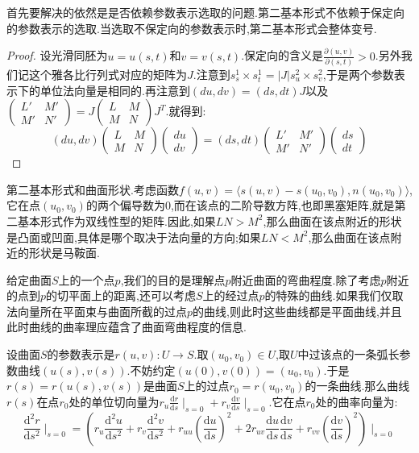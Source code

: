 首先要解决的依然是是否依赖参数表示选取的问题.第二基本形式不依赖于保定向的参数表示的选取.当选取不保定向的参数表示时,第二基本形式会整体变号.
\begin{proof}
	
	设光滑同胚为$u=u(s,t)$和$v=v(s,t)$.保定向的含义是$\frac{\partial(u,v)}{\partial(s,t)}>0$.另外我们记这个雅各比行列式对应的矩阵为$J$.注意到$s^1_s\times s^1_t=|J|s^2_u\times s^2_v$,于是两个参数表示下的单位法向量是相同的.再注意到$(du,dv)=(ds,dt)J$以及$\left(\begin{array}{cc} L'&M'\\ M'&N'\end{array}\right)=J\left(\begin{array}{cc} L&M\\ M&N\end{array}\right)J^T$.就得到:
	$$(du,dv)\left(\begin{array}{cc} L&M\\ M&N\end{array}\right)\left(\begin{array}{c} du\\ dv\end{array}\right)=(ds,dt)\left(\begin{array}{cc} L'&M'\\ M'&N'\end{array}\right)\left(\begin{array}{c} ds\\ dt\end{array}\right)$$
\end{proof}

第二基本形式和曲面形状.考虑函数$f(u,v)=\langle s(u,v)-s(u_0,v_0),n(u_0,v_0)\rangle$,它在点$(u_0,v_0)$的两个偏导数为0,而在该点的二阶导数方阵,也即黑塞矩阵,就是第二基本形式作为双线性型的矩阵.因此,如果$LN>M^2$,那么曲面在该点附近的形状是凸面或凹面,具体是哪个取决于法向量的方向;如果$LN<M^2$,那么曲面在该点附近的形状是马鞍面.

给定曲面$S$上的一个点$p$,我们的目的是理解点$p$附近曲面的弯曲程度.除了考虑$p$附近的点到$p$的切平面上的距离,还可以考虑$S$上的经过点$p$的特殊的曲线.如果我们仅取法向量所在平面束与曲面所截的过点$p$的曲线,则此时这些曲线都是平面曲线,并且此时曲线的曲率理应蕴含了曲面弯曲程度的信息.

设曲面$S$的参数表示是$r(u,v):U\to S$.取$(u_0,v_0)\in U$,取$U$中过该点的一条弧长参数曲线$(u(s),v(s))$.不妨约定$(u(0),v(0))=(u_0,v_0)$.于是$r(s)=r(u(s),v(s))$是曲面$S$上的过点$r_0=r(u_0,v_0)$的一条曲线.那么曲线$r(s)$在点$r_0$处的单位切向量为$r_u\frac{\mathrm{d}r}{\mathrm{d}s}\mid_{s=0}+r_v\frac{\mathrm{d}v}{\mathrm{d}s}\mid_{s=0}$.它在点$r_0$处的曲率向量为:
$$\frac{\mathrm{d}^2r}{\mathrm{d}s^2}\mid_{s=0}=\left(r_u\frac{\mathrm{d}^2u}{\mathrm{d}s^2}+r_v\frac{\mathrm{d}^2v}{\mathrm{d}s^2}+r_{uu}\left(\frac{\mathrm{d}u}{\mathrm{d}s}\right)^2+2r_{uv}\frac{\mathrm{d}u}{\mathrm{d}s}\frac{\mathrm{d}v}{\mathrm{d}s}+r_{vv}\left(\frac{\mathrm{d}v}{\mathrm{d}s}\right)^2\right)\mid_{s=0}$$

